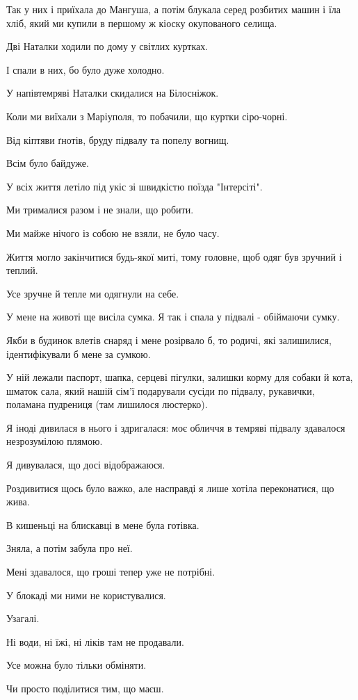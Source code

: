 Так у них і приїхала до Мангуша, а потім блукала серед розбитих машин і їла
хліб, який ми купили в першому ж  кіоску окупованого селища.

Дві Наталки ходили по дому у світлих куртках.

І спали в них, бо було дуже холодно.

У напівтемряві Наталки скидалися на Білосніжок.

Коли ми виїхали з Маріуполя, то побачили, що куртки сіро-чорні.

Від кіптяви ґнотів, бруду підвалу та попелу вогнищ. 

Всім було байдуже. 

У всіх життя летіло під укіс зі швидкістю поїзда "Інтерсіті". 

Ми трималися разом і не знали, що робити. 

Ми майже нічого із собою не взяли, не було часу. 

Життя могло закінчитися будь-якої миті, тому головне, щоб одяг був зручний і
теплий. 

Усе зручне й тепле ми одягнули на себе.

У мене на животі ще висіла сумка. Я так і спала у підвалі - обіймаючи сумку. 

Якби в будинок влетів снаряд і мене розірвало б, то родичі, які залишилися,
ідентифікували б мене за сумкою.

У ній лежали паспорт, шапка, серцеві пігулки, залишки корму для собаки й кота,
шматок сала, який нашій сім’ї подарували сусіди по підвалу, рукавички, поламана
пудрениця (там лишилося люстерко).

Я іноді дивилася в нього і здригалася: моє обличчя в темряві підвалу здавалося
незрозумілою плямою. 

Я  дивувалася, що досі відображаюся. 

Роздивитися щось було важко, але насправді я лише хотіла переконатися, що жива.

В кишеньці на блискавці в мене була готівка.

Зняла, а потім забула про неї.

Мені здавалося, що гроші тепер уже не потрібні. 

У блокаді  ми ними не користувалися. 

Узагалі. 

Ні води, ні їжі, ні ліків там не продавали. 

Усе можна було тільки обміняти.

 Чи просто поділитися тим, що маєш. 

